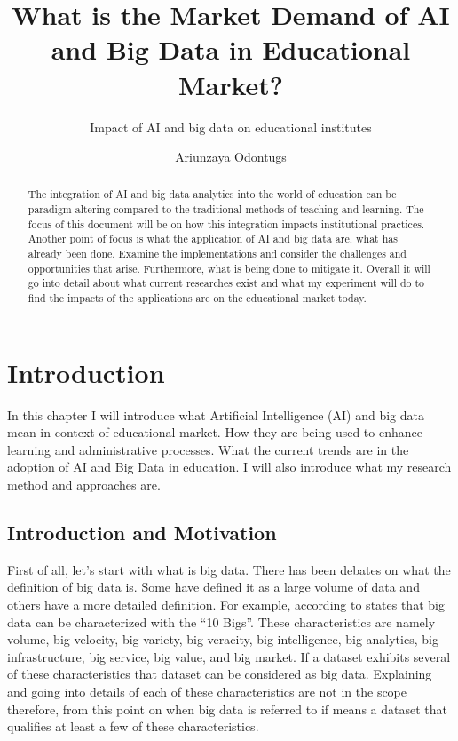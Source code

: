\documentclass{imc-inf}
\title{What is the Market Demand of AI and Big Data in Educational Market?}
\subtitle{Impact of AI and big data on educational institutes}
\author{Ariunzaya Odontugs}
\begin{document}
\frontmatter\maketitle{}


\begin{declarations}\end{declarations}



\begin{abstract}
	The integration of AI and big data analytics into the world of education can be paradigm altering compared to the traditional methods of teaching and learning. The focus of this document will be on how this integration impacts institutional practices. Another point of focus is what the application of AI and big data are, what has already been done. Examine the implementations and consider the challenges and opportunities that arise. Furthermore, what is being done to mitigate it. 
	Overall it will go into detail about what current researches exist and what my experiment will do to find the impacts of the applications are on the educational market today. 
	
	
\end{abstract}


%
\tableofcontents%
\clearpage


%
\listoffigures
\clearpage


\mainmatter%

\chapter{Introduction}\label{chap:introduction}

In this chapter I will introduce what Artificial Intelligence (AI) and big data mean in context of educational market. How they are being used to enhance learning and administrative processes. What the current trends are in the adoption of AI and Big Data in education. I will also introduce what my research method and approaches are. 

\section{Introduction and Motivation }
First of all, let’s start with what is big data. There has been debates on what the definition of big data is. Some have defined it as a large volume of data and others have a more detailed definition. For example, according to \cite{1} states that big data can be characterized with the “10 Bigs”. These characteristics are namely volume, big velocity, big variety, big veracity, big intelligence, big analytics, big infrastructure, big service, big value, and big market. If a dataset exhibits several of these characteristics that dataset can be considered as big data. Explaining and going into details of each of these characteristics are not in the scope therefore, from this point on when big data is referred to if means a dataset that qualifies at least a few of these characteristics. 
\end{document}
